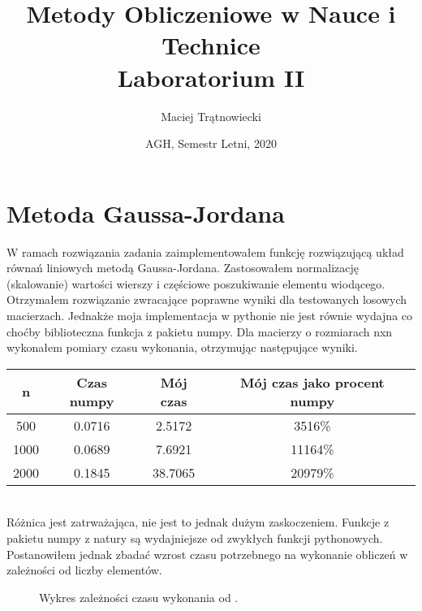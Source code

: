 \documentclass{article}
\title{Metody Obliczeniowe w Nauce i Technice\\ 
Laboratorium II}
\author{Maciej Trątnowiecki}
\date{AGH, Semestr Letni, 2020}
\begin{document}
    \maketitle
    \section{Metoda Gaussa-Jordana}
        W ramach rozwiązania zadania zaimplementowałem funkcję rozwiązującą układ równań liniowych metodą Gaussa-Jordana. Zastosowałem normalizację (skalowanie) wartości wierszy i częściowe poszukiwanie elementu wiodącego. Otrzymałem rozwiązanie zwracające poprawne wyniki dla testowanych losowych macierzach. Jednakże moja implementacja w pythonie nie jest równie wydajna co choćby biblioteczna funkcja z pakietu numpy. Dla macierzy o rozmiarach nxn wykonałem pomiary czasu wykonania, otrzymując następujące wyniki. 
        \begin{center}
        \begin{tabular}{|c|c|c|c|}
            \hline
             n & Czas numpy & Mój czas & Mój czas jako procent numpy\\
             \hline
             500 & 0.0716 & 2.5172 & 3516\% \\
             \hline
             1000 & 0.0689 & 7.6921  & 11164\% \\
             \hline
             2000 & 0.1845 & 38.7065  & 20979\% \\
             \hline
        \end{tabular}
        \end{center}\\
        
        Różnica jest zatrważająca, nie jest to jednak dużym zaskoczeniem. Funkcje z pakietu numpy z natury są wydajniejsze od zwykłych funkcji pythonowych. Postanowiłem jednak zbadać wzrost czasu potrzebnego na wykonanie obliczeń w zależności od liczby elementów. \\
        \begin{figure}[h!]
            \centering
            \caption{Wykres zależności czasu wykonania od .}
        \end{figure}
        
\end{document}

